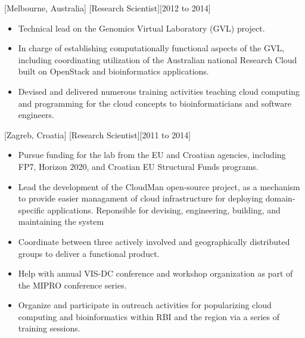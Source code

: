 \documentclass{article}
\begin{document}
[Melbourne, Australia]
[Research Scientist][2012 to 2014]
\begin{itemize}
    \item Technical lead on the Genomics Virtual Laboratory (GVL) project.
    \item In charge of establishing computationally functional aspects of the GVL, including coordinating utilization of the Australian national Research Cloud built on OpenStack and bioinformatics applications. 
    \item Devised and delivered numerous training activities teaching cloud computing and programming for the cloud concepts to bioinformaticians and software engineers.
\end{itemize}

[Zagreb, Croatia]
[Research Scientist][2011 to 2014]
\begin{itemize}
    \item Pursue funding for the lab from the EU and Croatian agencies, including FP7, Horizon 2020, and Croatian EU Structural Funds programs.
    \item Lead the development of the CloudMan open-source project, as a mechanism to provide easier managament of cloud infrastructure for deploying domain-specific applications. Reponsible for devising, engineering, building, and maintaining the system
    \item Coordinate between three actively involved and geographically distributed groups to deliver a functional product.
    \item Help with annual VIS-DC conference and workshop organization as part of the MIPRO conference series.
    \item Organize and participate in outreach activities for popularizing cloud computing and bioinformatics within RBI and the region via a series of training sessions.
\end{itemize}
\end{document}
